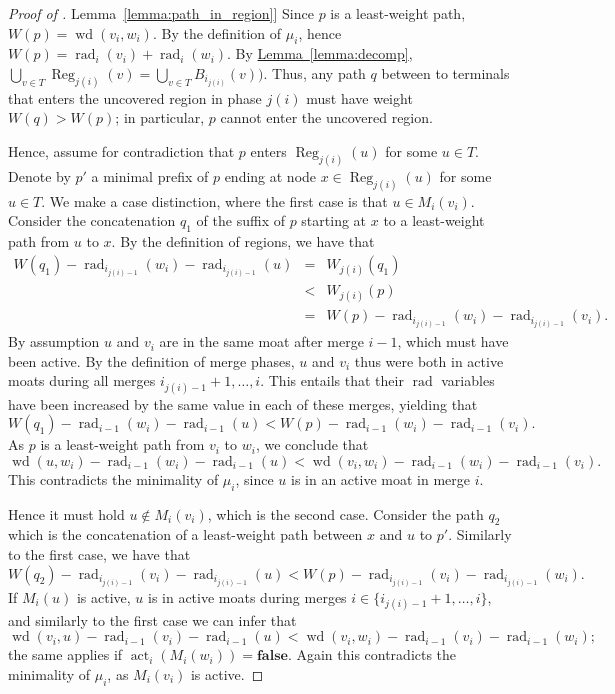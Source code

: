 \documentclass[letterpaper,11pt]{article}
\newcommand{\namedref}[2]{\hyperref[#2]{#1~\ref*{#2}}}
\newcommand{\lemmaref}[1]{\namedref{Lemma}{#1}}
\DeclareMathOperator{\act}{act}
\DeclareMathOperator{\moat}{rad}
\DeclareMathOperator{\Wd}{wd}
\DeclareMathOperator{\reg}{Reg}
\newcommand{\false}{\mathbf{false}}
\begin{document}
\begin{proof}[Proof of \lemmaref{lemma:path_in_region}]
Since $p$ is a least-weight path, $W(p)=\Wd(v_i,w_i)$. By the definition of
$\mu_i$, hence $W(p)=\moat_i(v_i)+\moat_i(w_i)$. By \lemmaref{lemma:decomp},
$\bigcup_{v\in T}\reg_{j(i)}(v)=\bigcup_{v\in T}B_{i_{j(i)}}(v))$.
Thus, any path $q$ between to terminals that enters the uncovered region in
phase $j(i)$ must have weight $W(q)>W(p)$; in particular, $p$ cannot enter the
uncovered region.

Hence, assume for contradiction that $p$ enters $\reg_{j(i)}(u)$ for some $u\in
T$. Denote by $p'$ a minimal prefix of $p$ ending at node $x\in \reg_{j(i)}(u)$
for some $u\in T$. We make a case distinction, where the first case is that
$u\in M_i(v_i)$. Consider the concatenation $q_1$ of the suffix of $p$ starting
at $x$ to a least-weight path from $u$ to $x$. By the definition of regions, we
have that
\begin{eqnarray*}
W(q_1)-\moat_{i_{j(i)-1}}(w_i)-\moat_{i_{j(i)-1}}(u) &=& W_{j(i)}(q_1)\\
&<& W_{j(i)}(p)\\
&=& W(p)-\moat_{i_{j(i)-1}}(w_i)-\moat_{i_{j(i)-1}}(v_i).
\end{eqnarray*}
By assumption $u$ and $v_i$ are in the same moat after merge $i-1$, which must
have been active. By the definition of merge phases, $u$ and $v_i$ thus were
both in active moats during all merges $i_{j(i)-1}+1,\ldots,i$. This entails
that their $\moat$ variables have been increased by the same value in each of
these merges, yielding that
\begin{equation*}
W(q_1)-\moat_{i-1}(w_i)-\moat_{i-1}(u)<W(p)-\moat_{i-1}(w_i)-\moat_{i-1}(v_i).
\end{equation*}
As $p$ is a least-weight path from $v_i$ to $w_i$, we conclude that
\begin{equation*}
\Wd(u,w_i)-\moat_{i-1}(w_i)-\moat_{i-1}(u)<\Wd(v_i,w_i)-\moat_{i-1}(w_i)-\moat_{i-1}(v_i).
\end{equation*}
This contradicts the minimality of $\mu_i$, since $u$ is in an active moat in
merge $i$.


Hence it must hold $u\notin M_i(v_i)$, which is the second case. Consider
the path $q_2$ which is the concatenation of a least-weight path between $x$ and
$u$ to $p'$. Similarly to the first case, we have that
\begin{equation*}
W(q_2)-\moat_{i_{j(i)-1}}(v_i)-\moat_{i_{j(i)-1}}(u) 
<W(p)-\moat_{i_{j(i)-1}}(v_i)-\moat_{i_{j(i)-1}}(w_i).
\end{equation*}
If $M_i(u)$ is active, $u$ is in active moats during merges $i\in
\{i_{j(i)-1}+1,\ldots,i\}$, and similarly to the first case we can infer that
\begin{equation*}
\Wd(v_i,u)-\moat_{i-1}(v_i)-\moat_{i-1}(u)<\Wd(v_i,w_i)-\moat_{i-1}(v_i)-\moat_{i-1}(w_i);
\end{equation*}
the same applies if $\act_i(M_i(w_i))=\false$. Again this contradicts the
minimality of $\mu_i$, as $M_i(v_i)$ is active. 


\end{proof}
\end{document}
